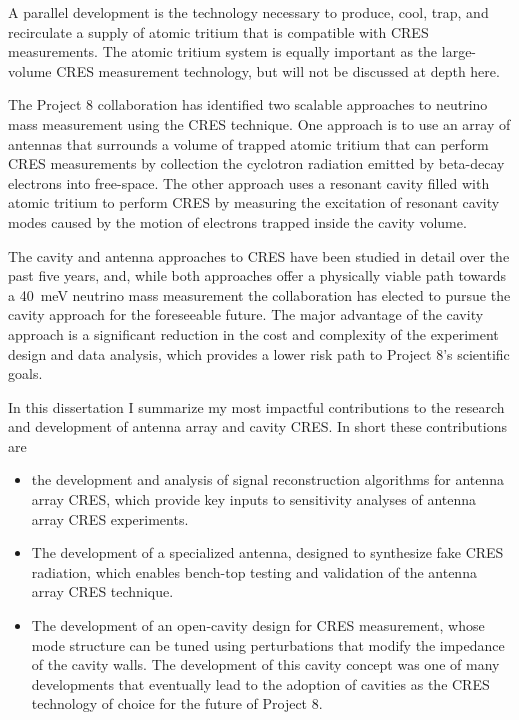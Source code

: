 A parallel development is the technology necessary to produce, cool, trap, and recirculate a supply of atomic tritium that is compatible with CRES measurements. The atomic tritium system is equally important as the large-volume CRES measurement technology, but will not be discussed at depth here.

The Project 8 collaboration has identified two scalable approaches to neutrino mass measurement using the CRES technique. One approach is to use an array of antennas that surrounds a volume of trapped atomic tritium that can perform CRES measurements by collection the cyclotron radiation emitted by beta-decay electrons into free-space. The other approach uses a resonant cavity filled with atomic tritium to perform CRES by measuring the excitation of resonant cavity modes caused by the motion of electrons trapped inside the cavity volume. 

The cavity and antenna approaches to CRES have been studied in detail over the past five years, and, while both approaches offer a physically viable path towards a 40~meV neutrino mass measurement the collaboration has elected to pursue the cavity approach for the foreseeable future. The major advantage of the cavity approach is a significant reduction in the cost and complexity of the experiment design and data analysis, which provides a lower risk path to Project 8's scientific goals. 

In this dissertation I summarize my most impactful contributions to the research and development of antenna array and cavity CRES. In short these contributions are
\begin{itemize}
    \item the development and analysis of signal reconstruction algorithms for antenna array CRES, which provide key inputs to sensitivity analyses of antenna array CRES experiments.
    \item The development of a specialized antenna, designed to synthesize fake CRES radiation, which enables bench-top testing and validation of the antenna array CRES technique.
    \item The development of an open-cavity design for CRES measurement, whose mode structure can be tuned using perturbations that modify the impedance of the cavity walls. The development of this cavity concept was one of many developments that eventually lead to the adoption of cavities as the CRES technology of choice for the future of Project 8. 
\end{itemize}

